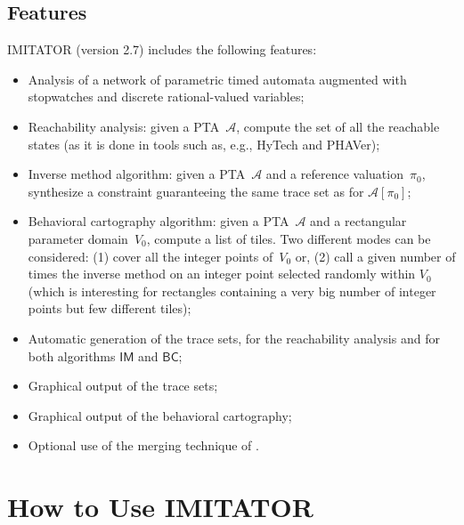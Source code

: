 \documentclass[a4paper,11pt]{report}
\newcommand{\A}{\mathcal{A}}
\newcommand{\BC}{\ensuremath{\mathsf{BC}}}
\newcommand{\IM}{\ensuremath{\mathsf{IM}}}
\newcommand{\hytech}{{\sc HyTech}}
\newcommand{\imitator}{\textsf{IMITATOR}}
\newcommand{\phaver}{PHAVer}
\newcommand{\imitatorversion}{2.7}
\begin{document}
	


\section{Features} \label{ss:features}

\imitator{} (version \imitatorversion{}) includes the following features:

\begin{itemize}
	\item Analysis of a network of parametric timed automata augmented with stopwatches and discrete rational-valued variables;
	\item Reachability analysis: given a PTA~$\A$, compute the set of all the reachable states (as it is done in tools such as, e.g., \hytech{} and \phaver{});
	\item Inverse method algorithm: given a PTA~$\A$ and a reference valuation~$\pi_0$, synthesize a constraint guaranteeing the same trace set as for $\A[\pi_0]$;
	\item Behavioral cartography algorithm: given a PTA~$\A$ and a rectangular parameter domain~$V_0$, compute a list of tiles. Two different modes can be considered: (1) cover all the integer points of~$V_0$ or, (2) call a given number of times the inverse method on an integer point selected randomly within $V_0$ (which is interesting for rectangles containing a very big number of integer points but few different tiles);
	\item Automatic generation of the trace sets, for the reachability analysis and for both algorithms $\IM$ and $\BC$;
	\item Graphical output of the trace sets;
	\item Graphical output of the behavioral cartography;
	\item Optional use of the merging technique of \cite{AFS12}.
\end{itemize}







\chapter{How to Use \imitator{}} \label{sec:how}
\end{document}
